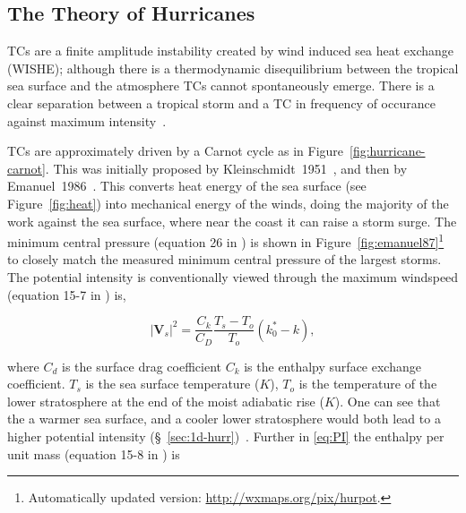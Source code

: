
\subsection{The Theory of Hurricanes}
\label{sec:hurr-theory}

\label{sec:cyclogenesis}
TCs are a finite amplitude instability created by
wind induced sea heat exchange (WISHE);
although there is a thermodynamic disequilibrium between the tropical sea
surface and the atmosphere TCs cannot spontaneously emerge. There is
a clear separation between a tropical storm and a TC
in frequency of occurance against maximum intensity~\cite{emanuel2005divine}.


\label{sec:carnot}





TCs are approximately driven by a Carnot cycle as in Figure~\ref{fig:hurricane-carnot}.
This was initially proposed by Kleinschmidt~1951~\cite{kleinschmidt1951grundlagen},
and then by Emanuel~1986~\cite{emanuel1986air, emanuel1987dependence, lilly1985steady,}.
This converts heat energy of the sea surface
(see Figure~\ref{fig:heat}) into
mechanical energy of the winds, doing the majority of the work against the sea surface,
 where near the coast it can raise a storm surge.
 The minimum central pressure (equation 26 in \cite{emanuel1986air}) is
 shown in Figure~\ref{fig:emanuel87}\footnote{Automatically updated version: \url{http://wxmaps.org/pix/hurpot}.}
 to closely match the measured
minimum central pressure of the largest storms.
The potential intensity is conventionally viewed through the
maximum windspeed (equation 15-7 in \cite{emanuel2018progress}) is,

\begin{equation}
\left|\mathbf{V}_{s}\right|^{2}=\frac{C_{k}}{C_{D}}
\frac{T_{s}-T_{o}}{T_{o}}\left(k_{0}^{*}-k\right),
\tag{PI}
\label{eq:PI}
\end{equation}

where $C_d$ is the surface drag coefficient $C_k$ is the
 enthalpy surface exchange coefficient.
$T_s$ is the sea surface temperature ($K$), $T_o$ is the temperature of the
lower stratosphere at the end of the moist adiabatic rise ($K$).
One can see that the a warmer sea surface, and a cooler lower stratosphere
would both lead to a higher potential intensity (§~\ref{sec:1d-hurr})~\cite{emanuel1991theory, emanuel2018progress}.
Further in \ref{eq:PI} the enthalpy per unit mass (equation 15-8 in \cite{emanuel2018progress}) is


